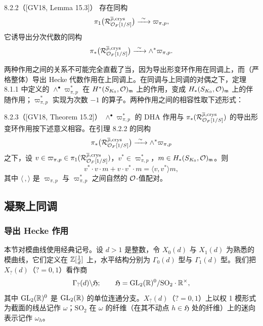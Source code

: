 \begin{lem}{8.2.2}（[GV18, Lemma 15.3]）\label{thm:a6-05-13}
存在同构
\[
\pi_1\bigl(\mathcal R^{\overline{\rho},\mathrm{crys}}_{\mathcal{O}_F[1/S]}\bigr)\xrightarrow{\ \sim\ }\varpi_{\pi,p},
\]
它诱导出分次代数的同构
\[
\pi_*\bigl(\mathcal R^{\overline{\rho},\mathrm{crys}}_{\mathcal{O}_F[1/S]}\bigr)\xrightarrow{\ \sim\ }\wedge^*\varpi_{\pi,p}.
\]
\end{lem}

两种作用之间的关系不可能完全直截了当，因为导出形变环作用在同调上，而（严格整体）导出 Hecke 代数作用在上同调上。在同调与上同调的对偶之下，定理 8.1.1 中定义的 $\wedge^\bullet\varpi^*_{\pi,p}$ 在 $H^*(S_{K_0},\mathcal{O})_{\mathfrak m}$ 上的作用，变成 $H_*(S_{K_0},\mathcal{O})_{\mathfrak m}$ 上的伴随作用；$\varpi^*_{\pi,p}$ 实现为次数 $-1$ 的算子。两种作用之间的相容性取下述形式：

\begin{thm}{8.2.3}（[GV18, Theorem 15.2]）\label{thm:a6-05-14}
$\wedge^\bullet\varpi^*_{\pi,p}$ 的 DHA 作用与 $\pi_*(\mathcal R^{\overline{\rho},\mathrm{crys}}_{\mathcal{O}_F[1/S]})$ 的导出形变环作用按下述意义相容。在引理 8.2.2 的同构
\[
\pi_*\bigl(\mathcal R^{\overline{\rho},\mathrm{crys}}_{\mathcal{O}_F[1/S]}\bigr)\xrightarrow{\ \sim\ }\wedge^*\varpi_{\pi,p}
\]
之下，设 $v\in\varpi_{\pi,p}\in\pi_1(\mathcal R^{\overline{\rho},\mathrm{crys}}_{\mathcal{O}_F[1/S]})$，$v^*\in\varpi^*_{\pi,p}$，$m\in H_*(S_{K_0},\mathcal{O})_{\mathfrak m}$。则
\[
v^*\cdot v\cdot m+v\cdot v^*\cdot m=\langle v,v^*\rangle m,
\]
其中 $\langle\,,\rangle$ 是 $\varpi_{\pi,p}$ 与 $\varpi^*_{\pi,p}$ 之间自然的 $\mathcal{O}$-值配对。
\end{thm}

\subsection{凝聚上同调}

\subsubsection{导出 Hecke 作用}

本节对模曲线使用经典记号。设 $d>1$ 是整数，令 $X_0(d)$ 与 $X_1(d)$ 为熟悉的模曲线，它们定义在 $\mathbb{Z}[\frac1d]$ 上，水平结构分别为 $\Gamma_0(d)$ 型与 $\Gamma_1(d)$ 型。我们把 $X_?(d)$（$?=0,1$）看作商
\[
\Gamma_?(d)\backslash\mathfrak H;\qquad\mathfrak H=\mathrm{GL}_2(\mathbb{R})^0/\mathrm{SO}_2\cdot\mathbb{R}^\times,
\]
其中 $\mathrm{GL}_2(\mathbb{R})^0$ 是 $\mathrm{GL}_2(\mathbb{R})$ 的单位连通分支。$X_?(d)$（$?=0,1$）上以权 1 模形式为截面的线丛记作 $\omega$；$\mathrm{SO}_2$ 在 $\omega$ 的纤维（在其不动点 $h\in\mathfrak H$ 处的纤维）上的迷向表示记作 $\omega_h$。

